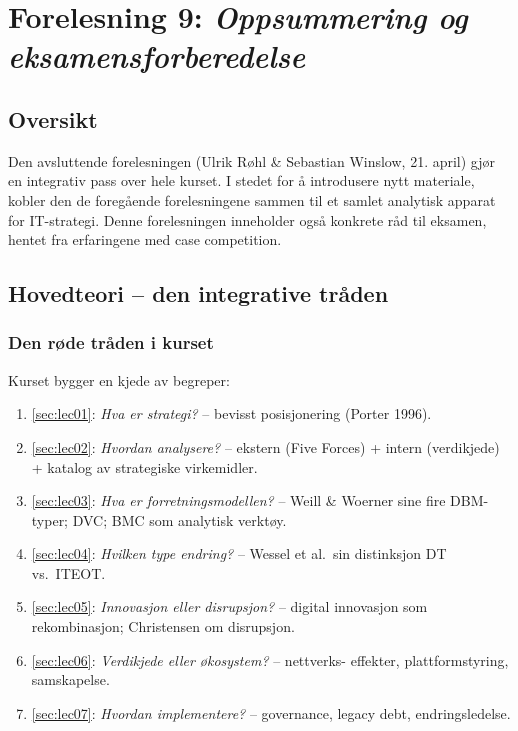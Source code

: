 \section{Forelesning 9: \emph{Oppsummering og eksamensforberedelse}}
\label{sec:lec09}

\subsection*{Oversikt}
Den avsluttende forelesningen (Ulrik Røhl \& Sebastian Winslow, 21. april) gjør
en integrativ pass over hele kurset. I stedet for å introdusere nytt
materiale, kobler den de foregående forelesningene sammen til et samlet
analytisk apparat for IT-strategi. Denne forelesningen inneholder også
konkrete råd til eksamen, hentet fra erfaringene med case competition.

\subsection{Hovedteori -- den integrative tråden}

\subsubsection*{Den røde tråden i kurset}
Kurset bygger en kjede av begreper:
\begin{enumerate}
  \item \autoref{sec:lec01}: \emph{Hva er strategi?} -- bevisst posisjonering
    (Porter 1996).
  \item \autoref{sec:lec02}: \emph{Hvordan analysere?} -- ekstern (Five
    Forces) + intern (verdikjede) + katalog av strategiske virkemidler.
  \item \autoref{sec:lec03}: \emph{Hva er forretningsmodellen?} -- Weill \&
    Woerner sine fire DBM-typer; DVC; BMC som analytisk verktøy.
  \item \autoref{sec:lec04}: \emph{Hvilken type endring?} -- Wessel et al.\
    sin distinksjon DT vs.\ ITEOT.
  \item \autoref{sec:lec05}: \emph{Innovasjon eller disrupsjon?} -- digital
    innovasjon som rekombinasjon; Christensen om disrupsjon.
  \item \autoref{sec:lec06}: \emph{Verdikjede eller økosystem?} -- nettverks-
    effekter, plattformstyring, samskapelse.
  \item \autoref{sec:lec07}: \emph{Hvordan implementere?} -- governance,
    legacy debt, endringsledelse.
\end{enumerate}

